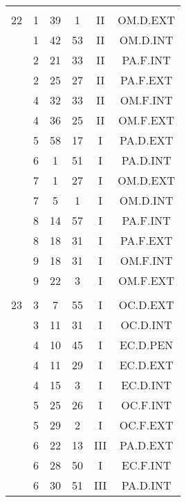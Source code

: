\documentclass[12pt, a4paper]{article}
\begin{document}
\begin{multicols}{3}
{\begin{tabular}{c c c c c c}
	 	 	 	 & & & & & \\%
	 	 	 	22 & 1 & 39 & 1 & II & OM.D.EXT\\%
	 	 	 	 & 1 & 42 & 53 & II & OM.D.INT\\%
	 	 	 	 & 2 & 21 & 33 & II & PA.F.INT\\%
	 	 	 	 & 2 & 25 & 27 & II & PA.F.EXT\\%
	 	 	 	 & 4 & 32 & 33 & II & OM.F.INT\\%
	 	 	 	 & 4 & 36 & 25 & II & OM.F.EXT\\%
	 	 	 	 & 5 & 58 & 17 & I & PA.D.EXT\\%
	 	 	 	 & 6 & 1 & 51 & I & PA.D.INT\\%
	 	 	 	 & 7 & 1 & 27 & I & OM.D.EXT\\%
	 	 	 	 & 7 & 5 & 1 & I & OM.D.INT\\%
	 	 	 	 & 8 & 14 & 57 & I & PA.F.INT\\%
	 	 	 	 & 8 & 18 & 31 & I & PA.F.EXT\\%
	 	 	 	 & 9 & 18 & 31 & I & OM.F.INT\\%
	 	 	 	 & 9 & 22 & 3 & I & OM.F.EXT\\%
	 	 	 	 & & & & & \\%
	 	 	 	23 & 3 & 7 & 55 & I & OC.D.EXT\\%
	 	 	 	 & 3 & 11 & 31 & I & OC.D.INT\\%
	 	 	 	 & 4 & 10 & 45 & I & EC.D.PEN\\%
	 	 	 	 & 4 & 11 & 29 & I & EC.D.EXT\\%
	 	 	 	 & 4 & 15 & 3 & I & EC.D.INT\\%
	 	 	 	 & 5 & 25 & 26 & I & OC.F.INT\\%
	 	 	 	 & 5 & 29 & 2 & I & OC.F.EXT\\%
	 	 	 	 & 6 & 22 & 13 & III & PA.D.EXT\\%
	 	 	 	 & 6 & 28 & 50 & I & EC.F.INT\\%
	 	 	 	 & 6 & 30 & 51 & III & PA.D.INT\\%
	 	 \end{tabular}
 	}
\end{multicols}
\end{document}
